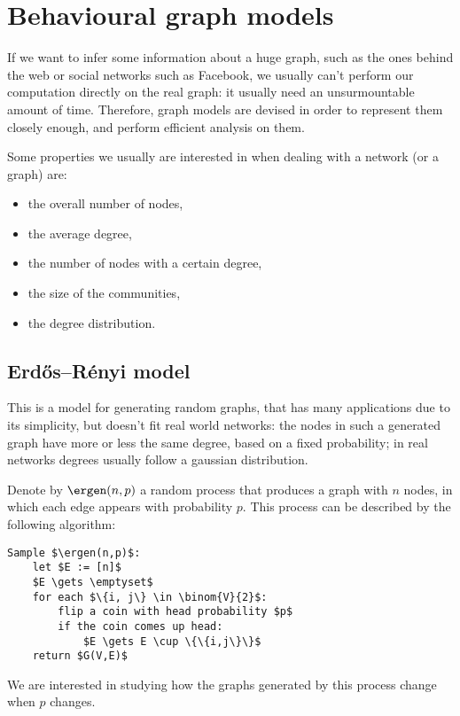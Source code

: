\chapter{Behavioural graph models}\label{sec:users-behaviors}

If we want to infer some information about a huge graph, such as the ones behind the web or social networks such as Facebook, we usually can't perform our computation directly on the real graph: it usually need an unsurmountable amount of time. Therefore, graph models are devised in order to represent them closely enough, and perform efficient analysis on them.

Some properties we usually are interested in when dealing with a network (or a graph) are:
\begin{itemize}
    \item the overall number of nodes,
    \item the average degree,
    \item the number of nodes with a certain degree,
    \item the size of the communities,
    \item the degree distribution.
\end{itemize}

\section{Erd\H{o}s–Rényi model}\label{sec:gnp}
    
This is a model for generating random graphs, that has many applications due to its simplicity, but doesn't fit real world networks: the nodes in such a generated graph have more or less the same degree, based on a fixed probability; in real networks degrees usually follow a gaussian distribution.

Denote by $\ergen(n, p)$ a random process that produces a graph with $n$ nodes, in which each edge appears with probability $p$. This process can be described by the following algorithm:
\begin{lstlisting}[caption = {The $\ergen(n,p)$ algorithm},
                    label   = {lst:gnp}]
Sample $\ergen(n,p)$:
    let $E := [n]$
    $E \gets \emptyset$
    for each $\{i, j\} \in \binom{V}{2}$:
        flip a coin with head probability $p$
        if the coin comes up head:
            $E \gets E \cup \{\{i,j\}\}$
    return $G(V,E)$
\end{lstlisting}

We are interested in studying how the graphs generated by this process change when $p$ changes.
    

